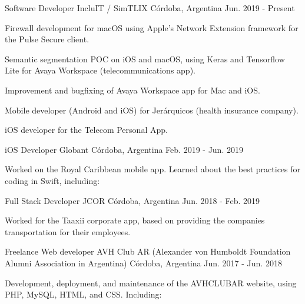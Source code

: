 \documentclass[10pt, a4paper]{resume}
\begin{document}
\begin{cventries}

  \cventry
    {Software Developer}
    {IncluIT / SimTLIX}
    {Córdoba, Argentina}
    {Jun. 2019 - Present}
    {
      \begin{cvitems}
      \item {Firewall development for macOS using Apple’s Network Extension framework for the Pulse Secure client.}
      \item {Semantic segmentation POC on iOS and macOS, using Keras and Tensorflow Lite for Avaya Workspace (telecommunications app).}
      \item {Improvement and bugfixing of Avaya Workspace app for Mac and iOS.}
      \item {Mobile developer (Android and iOS) for Jerárquicos (health insurance company).}
      \item {iOS developer for the Telecom Personal App.}
      \end{cvitems}
    }

  \cventry
    {iOS Developer}
    {Globant}
    {Córdoba, Argentina}
    {Feb. 2019 - Jun. 2019}
    {
      \begin{cvitems}
        \item {Worked on the Royal Caribbean mobile app. Learned about the best practices for coding in Swift, including: \newline
            }
      \end{cvitems}
    }

  \cventry
    {Full Stack Developer}
    {JCOR}
    {Córdoba, Argentina}
    {Jun. 2018 - Feb. 2019}
    {
      \begin{cvitems}
        \item {Worked for the Taaxii corporate app, based on providing the companies transportation for their employees.  \newline
        }
      \end{cvitems}
    }

  \cventry
    {Freelance Web developer}
    {AVH Club AR (Alexander von Humboldt Foundation Alumni Association in Argentina)}
    {Córdoba, Argentina}
    {Jun. 2017 - Jun. 2018}
    {
      \begin{cvitems}
        \item {Development, deployment, and maintenance of the AVHCLUBAR website, using PHP, MySQL, HTML, and CSS. Including: \newline
            }
      \end{cvitems}
    }


\end{cventries}
\end{document}
